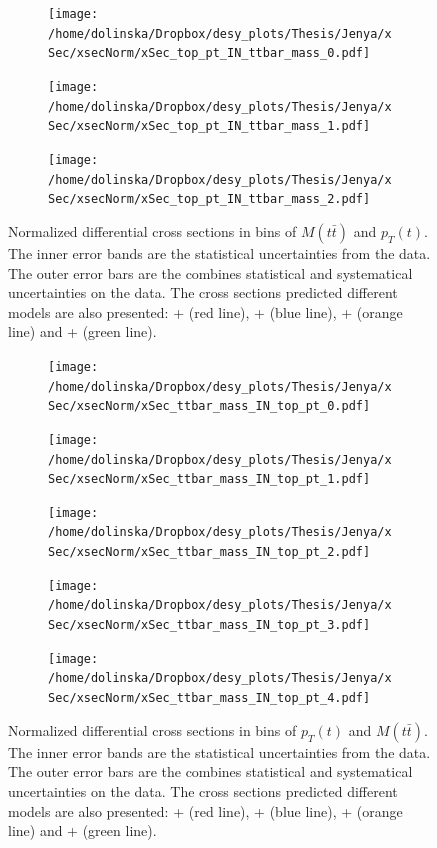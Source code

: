 \begin{figure}[p]
\centering
\begin{subfigure}
  \centering
  \texttt{[image: /home/dolinska/Dropbox/desy\_plots/Thesis/Jenya/xSec/xsecNorm/xSec\_top\_pt\_IN\_ttbar\_mass\_0.pdf]}
\end{subfigure}
\begin{subfigure}
  \centering
  \texttt{[image: /home/dolinska/Dropbox/desy\_plots/Thesis/Jenya/xSec/xsecNorm/xSec\_top\_pt\_IN\_ttbar\_mass\_1.pdf]}
\end{subfigure}
\begin{subfigure}
  \centering
  \texttt{[image: /home/dolinska/Dropbox/desy\_plots/Thesis/Jenya/xSec/xsecNorm/xSec\_top\_pt\_IN\_ttbar\_mass\_2.pdf]}
\end{subfigure}
\caption{Normalized differential cross sections in bins of $M(t\bar{t})$ and $p_{T}(t)$. The inner error bands are the statistical uncertainties from the data.
         The outer error bars are the combines statistical and systematical uncertainties on the data. The cross sections predicted different models are also presented:
         \MG + \PYTHIA (red line), \Powheg + \PYTHIA (blue line), \Powheg + \HERWIG (orange line) and \MCNLO + \HERWIG (green line).}
\label{fig:XS_2D_Mtt_pt}
\end{figure}
\begin{figure}
\centering
\begin{subfigure}
  \centering
  \texttt{[image: /home/dolinska/Dropbox/desy\_plots/Thesis/Jenya/xSec/xsecNorm/xSec\_ttbar\_mass\_IN\_top\_pt\_0.pdf]}
\end{subfigure}
\begin{subfigure}
  \centering
  \texttt{[image: /home/dolinska/Dropbox/desy\_plots/Thesis/Jenya/xSec/xsecNorm/xSec\_ttbar\_mass\_IN\_top\_pt\_1.pdf]}
\end{subfigure}
\begin{subfigure}
  \centering
  \texttt{[image: /home/dolinska/Dropbox/desy\_plots/Thesis/Jenya/xSec/xsecNorm/xSec\_ttbar\_mass\_IN\_top\_pt\_2.pdf]}
\end{subfigure}
\begin{subfigure}
  \centering
  \texttt{[image: /home/dolinska/Dropbox/desy\_plots/Thesis/Jenya/xSec/xsecNorm/xSec\_ttbar\_mass\_IN\_top\_pt\_3.pdf]}
\end{subfigure}
\begin{subfigure}
  \centering
  \texttt{[image: /home/dolinska/Dropbox/desy\_plots/Thesis/Jenya/xSec/xsecNorm/xSec\_ttbar\_mass\_IN\_top\_pt\_4.pdf]}
\end{subfigure}
\caption{Normalized differential cross sections in bins of $p_{T}(t)$ and $M(t\bar{t})$. The inner error bands are the statistical uncertainties from the data.
         The outer error bars are the combines statistical and systematical uncertainties on the data. The cross sections predicted different models are also presented:
         \MG + \PYTHIA (red line), \Powheg + \PYTHIA (blue line), \Powheg + \HERWIG (orange line) and \MCNLO + \HERWIG (green line).}
\label{fig:XS_2D_Mtt_pt1}
\end{figure}

